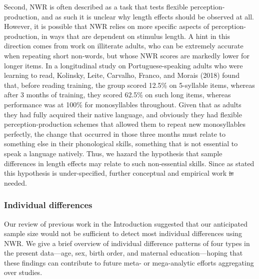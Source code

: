\documentclass[english,,man,floatsintext]{apa6} %
\providecommand{\DIFaddtex}[1]{{\protect\color{blue}\uwave{#1}}} %
\providecommand{\DIFdeltex}[1]{{\protect\color{red}\sout{#1}}}                      %
\providecommand{\DIFaddbegin}{} %
\providecommand{\DIFaddend}{} %
\providecommand{\DIFdelbegin}{} %
\providecommand{\DIFdelend}{} %
\providecommand{\DIFadd}[1]{\texorpdfstring{\DIFaddtex{#1}}{#1}} %
\providecommand{\DIFdel}[1]{\texorpdfstring{\DIFdeltex{#1}}{}} %
\newcommand{\DIFscaledelfig}{0.5}
\newlength{\DIFdelgraphicswidth} %
\newlength{\DIFdelgraphicsheight} %
\newcommand{\DIFaddincludegraphics}[2][]{{\color{blue}\fbox{\DIFOincludegraphics[#1]{#2}}}} %
\newcommand{\DIFdelincludegraphics}[2][]{%
	\sbox{\DIFdelgraphicsbox}{\DIFOincludegraphics[#1]{#2}}%
	\settoboxwidth{\DIFdelgraphicswidth}{\DIFdelgraphicsbox} %
	\settoboxtotalheight{\DIFdelgraphicsheight}{\DIFdelgraphicsbox} %
	\scalebox{\DIFscaledelfig}{%
		\parbox[b]{\DIFdelgraphicswidth}{\usebox{\DIFdelgraphicsbox}\\[-\baselineskip] \rule{\DIFdelgraphicswidth}{0em}}\llap{\resizebox{\DIFdelgraphicswidth}{\DIFdelgraphicsheight}{%
				\setlength{\unitlength}{\DIFdelgraphicswidth}%
				\begin{picture}(1,1)%
				\thicklines\linethickness{2pt} %
				{\color[rgb]{1,0,0}\put(0,0){\framebox(1,1){}}}%
				{\color[rgb]{1,0,0}\put(0,0){\line( 1,1){1}}}%
				{\color[rgb]{1,0,0}\put(0,1){\line(1,-1){1}}}%
				\end{picture}%
			}\hspace*{3pt}}} %
} %
\DeclareRobustCommand{\DIFaddbegin}{\DIFOaddbegin \let\includegraphics\DIFaddincludegraphics} %
\DeclareRobustCommand{\DIFaddend}{\DIFOaddend \let\includegraphics\DIFOincludegraphics} %
\DeclareRobustCommand{\DIFdelbegin}{\DIFOdelbegin \let\includegraphics\DIFdelincludegraphics} %
\DeclareRobustCommand{\DIFdelend}{\DIFOaddend \let\includegraphics\DIFOincludegraphics} %
\begin{document}
Second, NWR is often described as a task that tests flexible perception-production, and as such it is unclear why length effects should be observed at all. However, it is possible that NWR relies on more specific aspects of perception-production, in ways that are dependent on stimulus length. A hint in this direction comes from work on illiterate adults, who can be extremely accurate when repeating short non-words, but whose NWR scores are markedly lower for longer items. In a longitudinal study on Portuguese-speaking adults who were learning to read, Kolinsky, Leite, Carvalho, Franco, and Morais (2018) found that, before reading training, the group scored 12.5\% on 5-syllable items, whereas after 3 months of training, they scored 62.5\% on such long items, whereas performance was at 100\% for monosyllables throughout. Given that as adults they had fully acquired their native language, and obviously they had flexible perception-production schemes that allowed them to repeat new monosyllables perfectly, the change that occurred in those three months must relate to something else in their phonological skills, something that is not essential to speak a language natively. Thus, we hazard the hypothesis that sample differences in length effects may relate to such non-essential skills. Since as stated this hypothesis is under-specified, further \DIFaddbegin \DIFadd{both }\DIFaddend conceptual and empirical work \DIFdelbegin \DIFdel{is }\DIFdelend \DIFaddbegin \DIFadd{are }\DIFaddend needed.

\DIFdelbegin %
\DIFdelend \DIFaddbegin \hypertarget{individual-differences}{%
	\subsubsection{Individual differences}\label{individual-differences}}
\DIFaddend 

Our review of previous work in the Introduction suggested that our anticipated sample size would not be sufficient to detect most individual differences using NWR. We give a brief overview of individual difference patterns of four types in the present data---age, sex, birth order, and maternal education---hoping that these findings can contribute to future meta- or mega-analytic efforts aggregating over studies.
\end{document}
